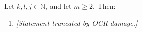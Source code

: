 
Let $k, l, j \in \mathbb{N}$, and let $m \geq 2$. Then:
\begin{enumerate}
    \item[(i)] \textit{[Statement truncated by OCR damage.]}
\end{enumerate}
